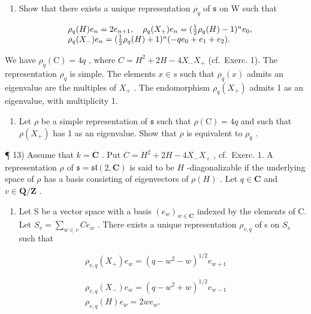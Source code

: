 \begin{enumerate}
\def\labelenumi{\alph{enumi})}
\tightlist
\item
  Show that there exists a unique representation \(\rho_{q}\) of \(\mathfrak{s}\) on W such that
\end{enumerate}

\[
\begin{array}{r l} & {\rho_ {q} (H) e _ {n} = 2 e _ {n + 1}, \quad \rho_ {q} (X _ {+}) e _ {n} = (\frac {1}{2} \rho_ {q} (H) - 1) ^ {n} e _ {0},} \\ & {\rho_ {q} (X _ {-}) e _ {n} = (\frac {1}{2} \rho_ {q} (H) + 1) ^ {n} (- q e _ {0} + e _ {1} + e _ {2}).} \end{array}
\]

We have \(\rho_{q}(\mathrm{C}) = 4q\) , where \(C = H^{2} + 2H - 4X_{-}X_{+}\) (cf.~Exerc. 1). The representation \(\rho_{q}\) is simple. The elements \(x \in s\) such that \(\rho_{q}(x)\) admits an eigenvalue are the multiples of \(X_{+}\) . The endomorphism \(\rho_{q}(X_{+})\) admits 1 as an eigenvalue, with multiplicity 1.

\begin{enumerate}
\def\labelenumi{\alph{enumi})}
\setcounter{enumi}{1}
\tightlist
\item
  Let \(\rho\) be a simple representation of \(\mathfrak{s}\) such that \(\rho(\mathrm{C}) = 4q\) and such that \(\rho(X_{+})\) has 1 as an eigenvalue. Show that \(\rho\) is equivalent to \(\rho_q\) .
\end{enumerate}

¶ 13) Assume that \(k = \mathbf{C}\) . Put \(C = H^2 + 2H - 4X_-X_+\) , cf.~Exerc. 1. A representation \(\rho\) of \(\mathfrak{s} = \mathfrak{sl}(2, \mathbf{C})\) is said to be \(H\) -diagonalizable if the underlying space of \(\rho\) has a basis consisting of eigenvectors of \(\rho(H)\) . Let \(q \in \mathbf{C}\) and \(v \in \mathbf{Q}/\mathbf{Z}\) .

\begin{enumerate}
\def\labelenumi{\alph{enumi})}
\tightlist
\item
  Let S be a vector space with a basis \((e_{w})_{w\in\mathbf{C}}\) indexed by the elements of C. Let \(S_{v}=\sum_{w\in v}Ce_{w}\) . There exists a unique representation \(\rho_{v,q}\) of s on \(S_{v}\) such that
\end{enumerate}

\[
\rho_ {v, q} (X _ {+}) e _ {w} = (q - w ^ {2} - w) ^ {1 / 2} e _ {w + 1}
\]

\[
\begin{array}{c} \rho_ {v, q} (X _ {-}) e _ {w} = (q - w ^ {2} + w) ^ {1 / 2} e _ {w - 1} \\ \rho_ {v, q} (H) e _ {w} = 2 w e _ {w}. \end{array}
\]

